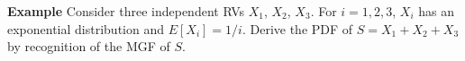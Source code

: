 \documentclass[11pt]{beamer}
\begin{document}
\begin{frame}

\end{frame}
\begin{frame}
\vspace{-2.5 cm}
\textbf{Example} Consider three independent RVs $X_1$, $X_2$, $X_3$. For $i=1,2,3$, $X_i$ has an exponential distribution and $E[X_i]=1/i$.
  Derive the PDF of $S=X_1+X_2+X_3$ by recognition of the MGF of $S$.
\end{frame}
\begin{frame}

\end{frame}
\begin{frame}

\end{frame}
\end{document}
